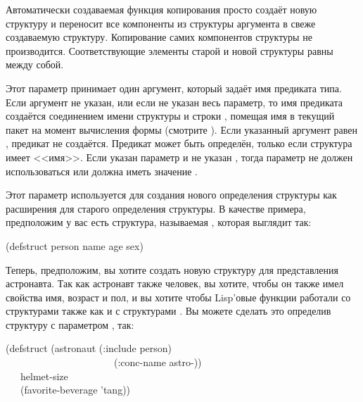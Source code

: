 \begin{flushdesc}
  Автоматически создаваемая функция копирования просто создаёт новую структуру и
  переносит все компоненты из структуры аргумента в свеже создаваемую
  структуру. Копирование самих компонентов структуры не производится.
  Соответствующие элементы старой и новой структуры равны  между собой.

\item[\cd{:predicate}] Этот параметр принимает один аргумент, который задаёт имя
  предиката типа.  Если аргумент не указан, или если не указан весь параметр, то
  имя предиката создаётся соединением имени структуры и строки ,
  помещая имя в текущий пакет на момент вычисления формы 
  (смотрите ).  Если указанный аргумент равен {\false}, предикат
  не создаётся.  Предикат может быть определён, только если структура имеет
  <<имя>>.  Если указан параметр  и не указан , тогда
  параметр  не должен использоваться или должна иметь значение
  {\false}.

\item[\cd{:include}] Этот параметр используется для создания нового определения
  структуры как расширения для старого определения структуры. В качестве
  примера, предположим у вас есть структура, называемая , которая
  выглядит так:
  \begin{lisp}
    (defstruct person name age sex)
  \end{lisp}
  Теперь, предположим, вы хотите создать новую структуру для представления
  астронавта.  Так как астронавт также человек, вы хотите, чтобы он также имел
  свойства имя, возраст и пол, и вы хотите чтобы Lisp'овые функции работали со
  структурами  также как и с структурами . Вы можете
  сделать это определив структуру  с параметром ,
  так:
  \begin{lisp}
    (defstruct (astronaut (:include person) \\
    ~~~~~~~~~~~~~~~~~~~~~~(:conc-name astro-)) \\
    ~~~helmet-size \\
    ~~~(favorite-beverage 'tang))
  \end{lisp}


\end{flushdesc}
